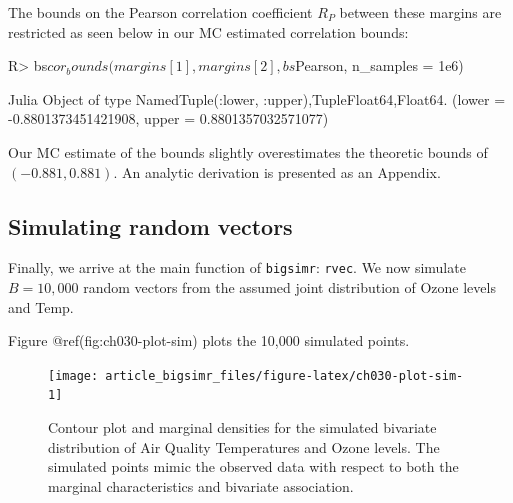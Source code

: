 \documentclass[
]{jss}
\begin{document}
The bounds on the Pearson correlation coefficient \(R_P\) between these
margins are restricted as seen below in our MC estimated correlation
bounds:

\begin{CodeChunk}
\begin{CodeInput}
R> bs$cor_bounds(margins[1], margins[2], bs$Pearson, n_samples = 1e6)
\end{CodeInput}
\begin{CodeOutput}
Julia Object of type NamedTuple{(:lower, :upper),Tuple{Float64,Float64}}.
(lower = -0.8801373451421908, upper = 0.8801357032571077)
\end{CodeOutput}
\end{CodeChunk}

Our MC estimate of the bounds slightly overestimates the theoretic
bounds of \((-0.881, 0.881)\). An analytic derivation is presented as an
Appendix.

\hypertarget{simulating-random-vectors}{%
\subsection{Simulating random vectors}\label{simulating-random-vectors}}

Finally, we arrive at the main function of \texttt{bigsimr}:
\texttt{rvec}. We now simulate \(B=10,000\) random vectors from the
assumed joint distribution of Ozone levels and Temp.

\begin{CodeChunk}
\end{CodeChunk}

Figure @ref(fig:ch030-plot-sim) plots the 10,000 simulated points.

\begin{CodeChunk}
\begin{figure}

{\centering \texttt{[image: article\_bigsimr\_files/figure-latex/ch030-plot-sim-1]} 

}

\caption[Contour plot and marginal densities for the simulated bivariate distribution of Air Quality Temperatures and Ozone levels]{Contour plot and marginal densities for the simulated bivariate distribution of Air Quality Temperatures and Ozone levels. The simulated points mimic the observed data with respect to both the marginal characteristics and bivariate association.}\label{fig:ch030-plot-sim}
\end{figure}
\end{CodeChunk}
\end{document}
